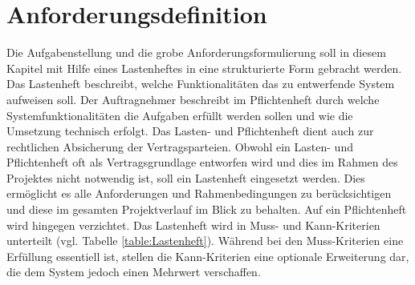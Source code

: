 \documentclass[ a4paper,
                oneside,
                toc=bibliography,
                toc=listof
                ]{scrbook}
\begin{document}
	\newpage
	
	\chapter{Anforderungsdefinition}
	\label{chap:Anforderungsdefinition}
	Die Aufgabenstellung und die grobe Anforderungsformulierung soll in diesem Kapitel mit Hilfe eines Lastenheftes in eine strukturierte Form gebracht werden. Das Lastenheft beschreibt, welche Funktionalitäten das zu entwerfende System aufweisen soll. Der Auftragnehmer beschreibt im Pflichtenheft durch welche Systemfunktionalitäten die Aufgaben erfüllt werden sollen und wie die Umsetzung technisch erfolgt. Das Lasten- und Pflichtenheft dient auch zur rechtlichen Absicherung der Vertragsparteien. Obwohl ein Lasten- und Pflichtenheft oft als Vertragsgrundlage entworfen wird und dies im Rahmen des Projektes nicht notwendig ist, soll ein Lastenheft eingesetzt werden. Dies ermöglicht es alle Anforderungen und Rahmenbedingungen zu berücksichtigen und diese im gesamten Projektverlauf im Blick zu behalten. Auf ein Pflichtenheft wird hingegen verzichtet. \cite{SoftwaretechnikBroy}
	Das Lastenheft wird in Muss- und Kann-Kriterien unterteilt (vgl. Tabelle \ref{table:Lastenheft}). Während bei den Muss-Kriterien eine Erfüllung essentiell ist, stellen die Kann-Kriterien eine optionale Erweiterung dar, die dem System jedoch einen Mehrwert verschaffen.\vspace{-8pt}
\end{document}
